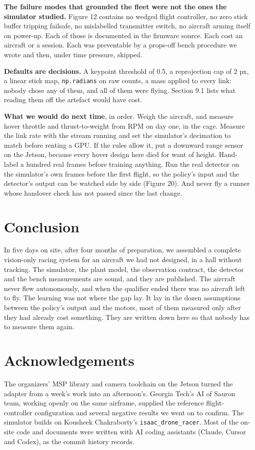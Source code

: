\documentclass{article}
\begin{document}
\textbf{The failure modes that grounded the fleet were not the ones the simulator studied.} Figure 12 contains no wedged flight controller, no zero stick buffer tripping failsafe, no mislabelled transmitter switch, no aircraft arming itself on power-up. Each of those is documented in the firmware source. Each cost an aircraft or a session. Each was preventable by a props-off bench procedure we wrote and then, under time pressure, skipped.

\textbf{Defaults are decisions.} A keypoint threshold of 0.5, a reprojection cap of 2 px, a linear stick map, \texttt{np.radians} on raw counts, a mass applied to every link: nobody chose any of them, and all of them were flying. Section 9.1 lists what reading them off the artefact would have cost.

\textbf{What we would do next time}, in order. Weigh the aircraft, and measure hover throttle and thrust-to-weight from RPM on day one, in the cage. Measure the link rate with the stream running and set the simulator's decimation to match before renting a GPU. If the rules allow it, put a downward range sensor on the Jetson, because every hover design here died for want of height. Hand-label a hundred real frames before training anything. Run the real detector on the simulator's own frames before the first flight, so the policy's input and the detector's output can be watched side by side (Figure 20). And never fly a runner whose handover check has not passed since the last change.

\section{Conclusion}
In five days on site, after four months of preparation, we assembled a complete vision-only racing system for an aircraft we had not designed, in a hall without tracking. The simulator, the plant model, the observation contract, the detector and the bench measurements are sound, and they are published. The aircraft never flew autonomously, and when the qualifier ended there was no aircraft left to fly. The learning was not where the gap lay. It lay in the dozen assumptions between the policy's output and the motors, most of them measured only after they had already cost something. They are written down here so that nobody has to measure them again.

\section*{Acknowledgements}
The organizers' MSP library and camera toolchain on the Jetson turned the adapter from a week's work into an afternoon's. Georgia Tech's AI of Sauron team, working openly on the same airframe, supplied the reference flight-controller configuration and several negative results we went on to confirm. The simulator builds on Kousheek Chakraborty's \texttt{isaac\_drone\_racer}. Most of the on-site code and documents were written with AI coding assistants (Claude, Cursor and Codex), as the commit history records.
\end{document}

